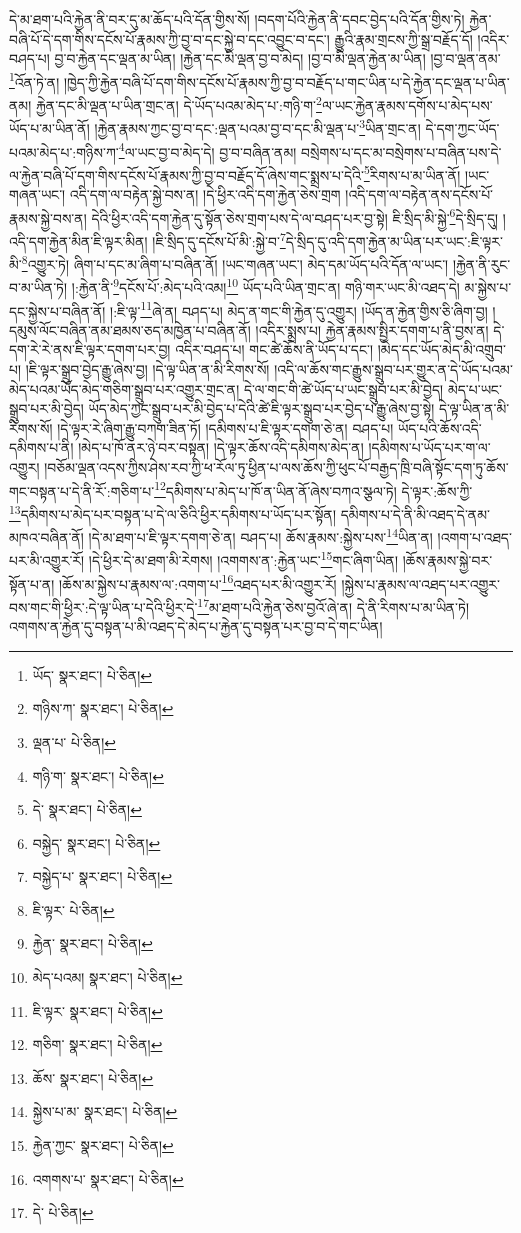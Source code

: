 དེ་མ་ཐག་པའི་རྐྱེན་ནི་བར་དུ་མ་ཆོད་པའི་དོན་གྱིས་སོ། །བདག་པོའི་རྐྱེན་ནི་དབང་བྱེད་པའི་དོན་གྱིས་ཏེ། རྐྱེན་བཞི་པོ་དེ་དག་གིས་དངོས་པོ་རྣམས་ཀྱི་བྱ་བ་དང་སྐྱེ་བ་དང་འབྱུང་བ་དང་། རྒྱུའི་རྣམ་གྲངས་ཀྱི་སྒྲ་བརྗོད་དོ། །འདིར་བཤད་པ། བྱ་བ་རྐྱེན་དང་ལྡན་མ་ཡིན། །རྐྱེན་དང་མི་ལྡན་བྱ་བ་མེད། །བྱ་བ་མི་ལྡན་རྐྱེན་མ་ཡིན། །བྱ་བ་ལྡན་ནམ་\footnote{ཡོད་  སྣར་ཐང་།  པེ་ཅིན། }འོན་ཏེ་ན། །ཁྱེད་ཀྱི་རྐྱེན་བཞི་པོ་དག་གིས་དངོས་པོ་རྣམས་ཀྱི་བྱ་བ་བརྗོད་པ་གང་ཡིན་པ་དེ་རྐྱེན་དང་ལྡན་པ་ཡིན་ནམ། རྐྱེན་དང་མི་ལྡན་པ་ཡིན་གྲང་ན། དེ་ཡོད་པའམ་མེད་པ་:གཉི་ག་\footnote{གཉིས་ཀ་  སྣར་ཐང་།  པེ་ཅིན། }ལ་ཡང་རྐྱེན་རྣམས་དགོས་པ་མེད་པས་ཡོད་པ་མ་ཡིན་ནོ། །རྐྱེན་རྣམས་ཀྱང་བྱ་བ་དང་:ལྡན་པའམ་བྱ་བ་དང་མི་ལྡན་པ་\footnote{ལྡན་པ་  པེ་ཅིན། }ཡིན་གྲང་ན། དེ་དག་ཀྱང་ཡོད་པའམ་མེད་པ་:གཉིས་ཀ་\footnote{གཉི་ག་  སྣར་ཐང་།  པེ་ཅིན། }ལ་ཡང་བྱ་བ་མེད་དེ། བྱ་བ་བཞིན་ནམ། བསྲེགས་པ་དང་མ་བསྲེགས་པ་བཞིན་པས་དེ་ལ་རྐྱེན་བཞི་པོ་དག་གིས་དངོས་པོ་རྣམས་ཀྱི་བྱ་བ་བརྗོད་དོ་ཞེས་གང་སྨྲས་པ་དེའི་\footnote{དེ་  སྣར་ཐང་།  པེ་ཅིན། }རིགས་པ་མ་ཡིན་ནོ། །ཡང་གཞན་ཡང་། འདི་དག་ལ་བརྟེན་སྐྱེ་བས་ན། །དེ་ཕྱིར་འདི་དག་རྐྱེན་ཅེས་གྲག །འདི་དག་ལ་བརྟེན་ནས་དངོས་པོ་རྣམས་སྐྱེ་བས་ན། དེའི་ཕྱིར་འདི་དག་རྐྱེན་དུ་སྟོན་ཅེས་གྲག་པས་དེ་ལ་བཤད་པར་བྱ་སྟེ། ཇི་སྲིད་མི་སྐྱེ་\footnote{བསྐྱེད་  སྣར་ཐང་།  པེ་ཅིན། }དེ་སྲིད་དུ། །འདི་དག་རྐྱེན་མིན་ཇི་ལྟར་མིན། །ཇི་སྲིད་དུ་དངོས་པོ་མི་:སྐྱེ་བ་\footnote{བསྐྱེད་པ་  སྣར་ཐང་།  པེ་ཅིན། }དེ་སྲིད་དུ་འདི་དག་རྐྱེན་མ་ཡིན་པར་ཡང་:ཇི་ལྟར་མི་\footnote{ཇི་ལྟར་  པེ་ཅིན། }འགྱུར་ཏེ། ཞིག་པ་དང་མ་ཞིག་པ་བཞིན་ནོ། །ཡང་གཞན་ཡང་། མེད་དམ་ཡོད་པའི་དོན་ལ་ཡང་། །རྐྱེན་ནི་རུང་བ་མ་ཡིན་ཏེ། །:རྐྱེན་ནི་\footnote{རྐྱེན་  སྣར་ཐང་།  པེ་ཅིན། }དངོས་པོ་:མེད་པའི་འམ།\footnote{མེད་པའམ།  སྣར་ཐང་།  པེ་ཅིན། } ཡོད་པའི་ཡིན་གྲང་ན། གཉི་གར་ཡང་མི་འཐད་དེ། མ་སྐྱེས་པ་དང་སྐྱེས་པ་བཞིན་ནོ། །:ཇི་ལྟ་\footnote{ཇི་ལྟར་  སྣར་ཐང་།  པེ་ཅིན། }ཞེ་ན། བཤད་པ། མེད་ན་གང་གི་རྐྱེན་དུ་འགྱུར། །ཡོད་ན་རྐྱེན་གྱིས་ཅི་ཞིག་བྱ། །དམུས་ལོང་བཞིན་ནམ་ཐམས་ཅད་མཁྱེན་པ་བཞིན་ནོ། །འདིར་སྨྲས་པ། རྐྱེན་རྣམས་སྤྱིར་དགག་པ་ནི་བྱས་ན། དེ་དག་རེ་རེ་ནས་ཇི་ལྟར་དགག་པར་བྱ། འདིར་བཤད་པ། གང་ཚེ་ཆོས་ནི་ཡོད་པ་དང་། །མེད་དང་ཡོད་མེད་མི་འགྲུབ་པ། །ཇི་ལྟར་སྒྲུབ་བྱེད་རྒྱུ་ཞེས་བྱ། །དེ་ལྟ་ཡིན་ན་མི་རིགས་སོ། །འདི་ལ་ཆོས་གང་རྒྱུས་སྒྲུབ་པར་གྱུར་ན་དེ་ཡོད་པའམ་མེད་པའམ་ཡོད་མེད་གཅིག་སྒྲུབ་པར་འགྱུར་གྲང་ན། དེ་ལ་གང་གི་ཚེ་ཡོད་པ་ཡང་སྒྲུབ་པར་མི་བྱེད། མེད་པ་ཡང་སྒྲུབ་པར་མི་བྱེད། ཡོད་མེད་ཀྱང་སྒྲུབ་པར་མི་བྱེད་པ་དེའི་ཚེ་ཇི་ལྟར་སྒྲུབ་པར་བྱེད་པ་རྒྱུ་ཞེས་བྱ་སྟེ། དེ་ལྟ་ཡིན་ན་མི་རིགས་སོ། །དེ་ལྟར་རེ་ཞིག་རྒྱུ་བཀག་ཟིན་ཏོ། །དམིགས་པ་ཇི་ལྟར་དགག་ཅེ་ན། བཤད་པ། ཡོད་པའི་ཆོས་འདི་དམིགས་པ་ནི། །མེད་པ་ཁོ་ནར་ཉེ་བར་བསྟན། །དེ་ལྟར་ཆོས་འདི་དམིགས་མེད་ན། །དམིགས་པ་ཡོད་པར་ག་ལ་འགྱུར། །བཅོམ་ལྡན་འདས་ཀྱིས་ཤེས་རབ་ཀྱི་ཕ་རོལ་ཏུ་ཕྱིན་པ་ལས་ཆོས་ཀྱི་ཕུང་པོ་བརྒྱད་ཁྲི་བཞི་སྟོང་དག་ཏུ་ཆོས་གང་བསྟན་པ་དེ་ནི་རོ་:གཅིག་པ་\footnote{གཅིག་  སྣར་ཐང་།  པེ་ཅིན། }དམིགས་པ་མེད་པ་ཁོ་ན་ཡིན་ནོ་ཞེས་བཀའ་སྩལ་ཏེ། དེ་ལྟར་:ཆོས་ཀྱི་\footnote{ཆོས་  སྣར་ཐང་།  པེ་ཅིན། }དམིགས་པ་མེད་པར་བསྟན་པ་དེ་ལ་ཅིའི་ཕྱིར་དམིགས་པ་ཡོད་པར་སྟོན། དམིགས་པ་དེ་ནི་མི་འཐད་དེ་ནམ་མཁའ་བཞིན་ནོ། །དེ་མ་ཐག་པ་ཇི་ལྟར་དགག་ཅེ་ན། བཤད་པ། ཆོས་རྣམས་:སྐྱེས་པས་\footnote{སྐྱེས་པ་མ་  སྣར་ཐང་།  པེ་ཅིན། }ཡིན་ན། །འགག་པ་འཐད་པར་མི་འགྱུར་རོ། །དེ་ཕྱིར་དེ་མ་ཐག་མི་རེགས། །འགགས་ན་:རྐྱེན་ཡང་\footnote{རྐྱེན་ཀྱང་  སྣར་ཐང་།  པེ་ཅིན། }གང་ཞིག་ཡིན། །ཆོས་རྣམས་སྐྱེ་བར་སྟོན་པ་ན། །ཆོས་མ་སྐྱེས་པ་རྣམས་ལ་:འགག་པ་\footnote{འགགས་པ་  སྣར་ཐང་།  པེ་ཅིན། }འཐད་པར་མི་འགྱུར་རོ། །སྐྱེས་པ་རྣམས་ལ་འཐད་པར་འགྱུར་བས་གང་གི་ཕྱིར་:དེ་ལྟ་ཡིན་པ་དེའི་ཕྱིར་དེ་\footnote{དེ་  པེ་ཅིན། }མ་ཐག་པའི་རྐྱེན་ཅེས་བྱའོ་ཞེ་ན། དེ་ནི་རིགས་པ་མ་ཡིན་ཏེ། འགགས་ན་རྐྱེན་དུ་བསྟན་པ་མི་འཐད་དེ་མེད་པ་རྐྱེན་དུ་བསྟན་པར་བྱ་བ་དེ་གང་ཡིན། 